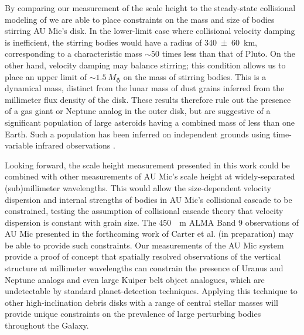 \documentclass[modern]{aastex62}
\begin{document}
By comparing our measurement of the scale height to the steady-state collisional modeling of \cite{pan&schlichting12} we are able to place constraints on the mass and size of bodies stirring AU Mic's disk.
In the lower-limit case where collisional velocity damping is inefficient, the stirring bodies would have a radius of \SI{340 \pm 60}{km}, corresponding to a characteristic mass $\sim 50$ times less than that of Pluto.
On the other hand, velocity damping may balance stirring; this condition allows us to place an upper limit of $\sim \SI{1.5}{M_\earth}$ on the mass of stirring bodies.
This is a dynamical mass, distinct from the lunar mass of dust grains inferred from the millimeter flux density of the disk.
These results therefore rule out the presence of a gas giant or Neptune analog in the outer disk, but are suggestive of a significant 
population of large asteroids 
having a combined mass of less than one Earth. Such a population has been inferred on independent
grounds using time-variable infrared observations \citep{chiang&fung17}.

Looking forward, the scale height measurement presented in this work could be combined with other measurements of AU Mic's scale height at widely-separated (sub)millimeter wavelengths.
This would allow the size-dependent velocity dispersion and internal strengths of bodies in AU Mic's collisional cascade to be constrained, testing the assumption of collisional cascade theory that velocity dispersion is constant with grain size.
The \SI{450}{\mu m} ALMA Band 9 observations of AU Mic presented in the forthcoming work of Carter et al. (in preparation) may be able to provide such constraints.
Our measurements of the AU Mic system provide a proof of concept that spatially resolved observations of the vertical structure at millimeter wavelengths can constrain the presence of Uranus and Neptune analogs and even large Kuiper belt object analogues, which are undetectable by standard planet-detection techniques.  
Applying this technique to other high-inclination debris disks with a range of central stellar masses will provide unique constraints on the prevalence of 
large perturbing bodies
throughout the Galaxy.
\end{document}
